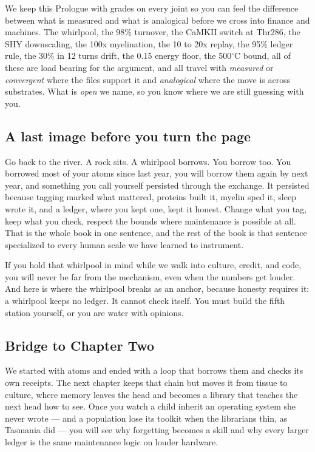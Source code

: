 We keep this Prologue with grades on every joint so you can feel the difference between what is measured and what is analogical before we cross into finance and machines. The whirlpool, the 98\% turnover, the CaMKII switch at Thr286, the SHY downscaling, the 100x myelination, the 10 to 20x replay, the 95\% ledger rule, the 30\% in 12 turns drift, the 0.15 energy floor, the 500$^\circ$C bound, all of these are load bearing for the argument, and all travel with \textit{measured} or \textit{convergent} where the files support it and \textit{analogical} where the move is across substrates. What is \textit{open} we name, so you know where we are still guessing with you.

\subsection*{A last image before you turn the page}

Go back to the river. A rock sits. A whirlpool borrows. You borrow too. You borrowed most of your atoms since last year, you will borrow them again by next year, and something you call yourself persisted through the exchange. It persisted because tagging marked what mattered, proteins built it, myelin sped it, sleep wrote it, and a ledger, where you kept one, kept it honest. Change what you tag, keep what you check, respect the bounds where maintenance is possible at all. That is the whole book in one sentence, and the rest of the book is that sentence specialized to every human scale we have learned to instrument.

If you hold that whirlpool in mind while we walk into culture, credit, and code, you will never be far from the mechanism, even when the numbers get louder. And here is where the whirlpool breaks as an anchor, because honesty requires it: a whirlpool keeps no ledger. It cannot check itself. You must build the fifth station yourself, or you are water with opinions.

\subsection*{Bridge to Chapter Two}

We started with atoms and ended with a loop that borrows them and checks its own receipts. The next chapter keeps that chain but moves it from tissue to culture, where memory leaves the head and becomes a library that teaches the next head how to see. Once you watch a child inherit an operating system she never wrote --- and a population lose its toolkit when the librarians thin, as Tasmania did --- you will see why forgetting becomes a skill and why every larger ledger is the same maintenance logic on louder hardware.
